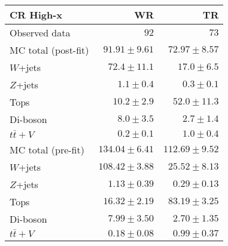 \begin{table}
  \begin{center}
    \caption{ \label{tab::BGestimation::CRyields_Highx}   }


    \begin{tabular*}{\textwidth}{@{\extracolsep{\fill}}lrr}
      \toprule
      \textbf{CR High-x} & WR & TR \\
      \midrule
      

Observed data & $92$ & $73$ \\
\midrule
\midrule
MC total (post-fit) & $91.91 \pm 9.61$ & $72.97 \pm 8.57$ \\
\midrule
$W$+jets & $72.4 \pm 11.1$ & $17.0 \pm 6.5$ \\
$Z$+jets & $1.1 \pm 0.4$ & $0.3 \pm 0.1$ \\
Tops & $10.2 \pm 2.9$ & $52.0 \pm 11.3$ \\
Di-boson & $8.0 \pm 3.5$ & $2.7 \pm 1.4$ \\
$t\bar{t}+V$ & $0.2 \pm 0.1$ & $1.0 \pm 0.4$ \\
\midrule
\midrule
MC total (pre-fit) & $134.04 \pm 6.41$ & $112.69 \pm 9.52$ \\
\midrule
$W$+jets & $108.42 \pm 3.88$ & $25.52 \pm 8.13$ \\
$Z$+jets & $1.13 \pm 0.39$ & $0.29 \pm 0.13$ \\
Tops & $16.32 \pm 2.19$ & $83.19 \pm 3.25$ \\
Di-boson & $7.99 \pm 3.50$ & $2.70 \pm 1.35$ \\
$t\bar{t}+V$ & $0.18 \pm 0.08$ & $0.99 \pm 0.37$ \\
    \bottomrule
    \end{tabular*}
    
  \end{center}
\end{table}


